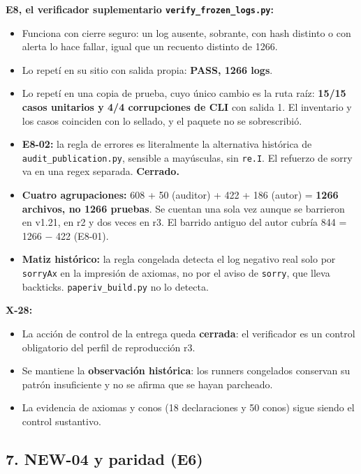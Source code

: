 \documentclass[
]{article}
\providecommand{\tightlist}{%
  \setlength{\itemsep}{0pt}\setlength{\parskip}{0pt}}
\begin{document}
\textbf{E8, el verificador suplementario
\texttt{verify\_frozen\_logs.py}:}

\begin{itemize}
\tightlist
\item
  Funciona con cierre seguro: un log ausente, sobrante, con hash
  distinto o con alerta lo hace fallar, igual que un recuento distinto
  de 1266.
\item
  Lo repetí en su sitio con salida propia: \textbf{PASS, 1266 logs}.
\item
  Lo repetí en una copia de prueba, cuyo único cambio es la ruta raíz:
  \textbf{15/15 casos unitarios y 4/4 corrupciones de CLI} con salida 1.
  El inventario y los casos coinciden con lo sellado, y el paquete no se
  sobrescribió.
\item
  \textbf{E8-02:} la regla de errores es literalmente la alternativa
  histórica de \texttt{audit\_publication.py}, sensible a mayúsculas,
  sin \texttt{re.I}. El refuerzo de sorry va en una regex separada.
  \textbf{Cerrado.}
\item
  \textbf{Cuatro agrupaciones:} 608 + 50 (auditor) + 422 + 186 (autor) =
  \textbf{1266 archivos, no 1266 pruebas}. Se cuentan una sola vez
  aunque se barrieron en v1.21, en r2 y dos veces en r3. El barrido
  antiguo del autor cubría 844 = 1266 − 422 (E8-01).
\item
  \textbf{Matiz histórico:} la regla congelada detecta el log negativo
  real solo por \texttt{sorryAx} en la impresión de axiomas, no por el
  aviso de \texttt{sorry}, que lleva backticks.
  \texttt{paperiv\_build.py} no lo detecta.
\end{itemize}

\textbf{X-28:}

\begin{itemize}
\tightlist
\item
  La acción de control de la entrega queda \textbf{cerrada}: el
  verificador es un control obligatorio del perfil de reproducción r3.
\item
  Se mantiene la \textbf{observación histórica}: los runners congelados
  conservan su patrón insuficiente y no se afirma que se hayan
  parcheado.
\item
  La evidencia de axiomas y conos (18 declaraciones y 50 conos) sigue
  siendo el control sustantivo.
\end{itemize}

\subsection{7. NEW-04 y paridad (E6)}\label{7-new-04-y-paridad-e6}
\end{document}
